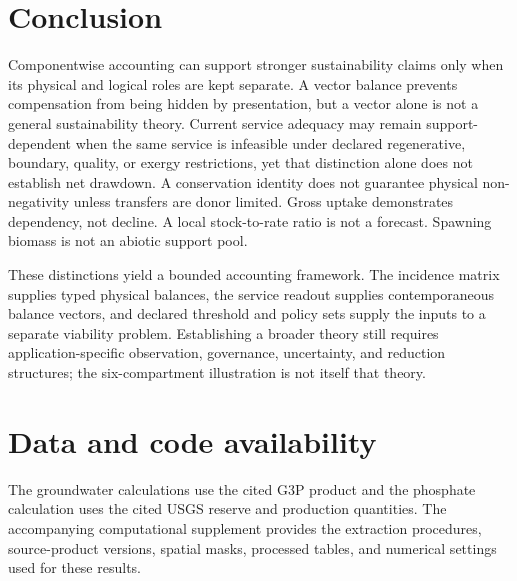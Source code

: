 \documentclass[11pt]{article}
\begin{document}
\section{Conclusion}

Componentwise accounting can support stronger sustainability claims only when its physical and logical roles are kept separate. A vector balance prevents compensation from being hidden by presentation, but a vector alone is not a general sustainability theory. Current service adequacy may remain support-dependent when the same service is infeasible under declared regenerative, boundary, quality, or exergy restrictions, yet that distinction alone does not establish net drawdown. A conservation identity does not guarantee physical non-negativity unless transfers are donor limited. Gross uptake demonstrates dependency, not decline. A local stock-to-rate ratio is not a forecast. Spawning biomass is not an abiotic support pool.

These distinctions yield a bounded accounting framework. The incidence matrix supplies typed physical balances, the service readout supplies contemporaneous balance vectors, and declared threshold and policy sets supply the inputs to a separate viability problem. Establishing a broader theory still requires application-specific observation, governance, uncertainty, and reduction structures; the six-compartment illustration is not itself that theory.

\section*{Data and code availability}
The groundwater calculations use the cited G3P product and the phosphate calculation uses the cited USGS reserve and production quantities. The accompanying computational supplement provides the extraction procedures, source-product versions, spatial masks, processed tables, and numerical settings used for these results.


\end{document}

